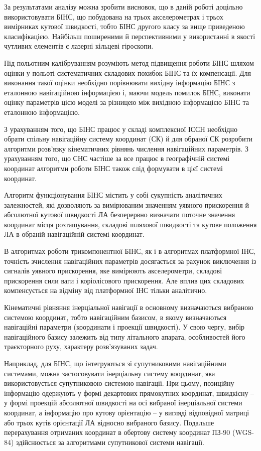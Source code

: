 За результатами аналізу можна зробити висновок, що в даній роботі доцільно 
використовувати БІНС, що побудована на  трьох акселерометрах  і трьох вимірниках 
кутової швидкості, тобто  БІНС другого класу за вище приведеною класифікацією. 
Найбільш поширеними й перспективними у використанні в якості чутливих елементів є 
лазерні кільцеві гіроскопи. 

Під польотним калібруванням розуміють метод підвищення роботи БІНС шляхом оцінки у польоті 
систематичних складових похибок БІНС та їх компенсації. Для виконання такої оцінки необхідно 
порівнювати вихідну інформацію БІНС з еталонною навігаційною інформацією і, маючи модель 
помилок БІНС, виконати оцінку параметрів цією моделі за різницею між вихідною інформацією 
БІНС та еталонною інформацією.

З урахуванням того, що БІНС працює у складі комплексної ІССН необхідно обрати спільну 
навігаційну систему  координат (СК) й для обраної СК розробити  алгоритми розв’язку 
кінематичних рівнянь числення навігаційних параметрів. З урахуванням того, 
що СНС частіше за все працює в географічній системі координат алгоритми 
роботи БІНС також слід формувати в цієї системі координат.  

Алгоритм функціонування БІНС містить у собі сукупність аналітичних залежностей, які 
дозволяють за вимірюваним значенням уявного прискорення й абсолютної кутової швидкості ЛА безперервно визначати поточне значення координат місця розташування, складові шляхової швидкості та кутове положення ЛА в обраній навігаційній системі координат.

В алгоритмах роботи  трикомпонентної БІНС, як і в алгоритмах платформної ІНС, точність 
зчислення навігаційних параметрів досягається за рахунок виключення із сигналів уявного 
прискорення, яке вимірюють акселерометри, складові прискорення сили ваги і коріолісового 
прискорення. Але вплив цих складових компенсується на відміну від платформної ІНС 
тільки аналітично. 

Кінематичні рівняння інерціальної  навігації в основному визначаються вибраною системою 
координат, тобто навігаційним базисом, в якому визначаються навігаційні параметри 
(координати і проекції швидкості). У свою чергу, вибір навігаційного базису залежить 
від типу літального апарата, особливостей його траєкторного руху, характеру розв'язуваних 
задач.

Наприклад, для БІНС, що інтегруються зі супутниковими навігаційними системами, можна 
застосовувати інерціальну систему координат, яка використовується супутниковою системою 
навігації.  При цьому, позиційну інформацію одержують у формі декартових прямокутних 
координат, швидкісну -- у формі проекцій абсолютної швидкості на осі вибраної інерціальної 
системи координат, а інформацію про кутову орієнтацію -- у вигляді відповідної матриці 
або трьох кутів орієнтації ЛА відносно вибраного базису. Подальше перерахування отриманих 
координат в обертову систему координат ПЗ-90 (WGS-84) здійснюється за алгоритмами 
супутникової системи навігації.

